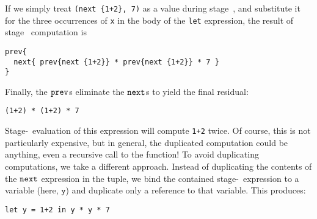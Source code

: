 If we simply treat \verb|(next {1+2}, 7)| as a value during stage~\bbone, and
substitute it for the three occurrences of \verb|x| in the body of the
\verb|let| expression, the result of stage \bbone\ computation is
\begin{lstlisting} 
prev{
  next{ prev{next {1+2}} * prev{next {1+2}} * 7 }
}
\end{lstlisting}
Finally, the ${\tt prev}$s eliminate the ${\tt next}$s to yield the final residual:
\begin{lstlisting} 
(1+2) * (1+2) * 7
\end{lstlisting}
Stage-\bbtwo\ evaluation of this expression will compute \verb|1+2| twice. Of
course, this is not particularly expensive, but in general, the duplicated
computation could be anything, even a recursive call to the function! To avoid duplicating
computations, we take a different approach.  Instead of
duplicating the contents of the ${\tt next}$ expression in the tuple, we bind the contained stage-\bbtwo\ expression to
a variable (here, $\mathtt{y}$) and duplicate only a reference to that variable.
This produces:
\begin{lstlisting} 
let y = 1+2 in y * y * 7
\end{lstlisting}

